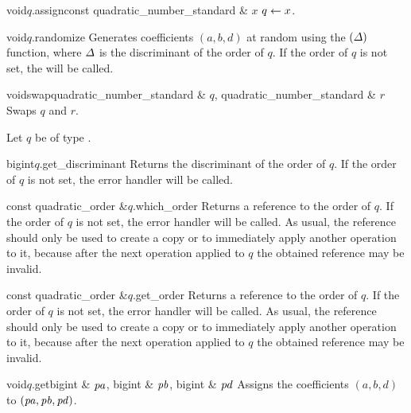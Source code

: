\begin{fcode}{void}{$q$.assign}{const quadratic_number_standard & $x$}
  $q \leftarrow x$.
\end{fcode}

\begin{fcode}{void}{$q$.randomize}{}
  Generates coefficients $(a,b,d)$ at random using the  $(\varDelta)$
  function, where $\varDelta$ is the discriminant of the order of $q$.  If the order of $q$ is not set,
  the \LEH will be called.
\end{fcode}

\begin{fcode}{void}{swap}{quadratic_number_standard & $q$, quadratic_number_standard & $r$}
  Swaps $q$ and $r$.
\end{fcode}



\ACCS

Let $q$ be of type .

\begin{cfcode}{bigint}{$q$.get_discriminant}{}
  Returns the discriminant of the order of $q$.  If the order of $q$ is not set, the error
  handler will be called.
\end{cfcode}

\begin{cfcode}{const quadratic_order &}{$q$.which_order}{}
  Returns a  reference to the order of $q$.  If the order of $q$ is not set, the
  error handler will be called.  As usual, the  reference should only be used to
  create a copy or to immediately apply another operation to it, because after the next
  operation applied to $q$ the obtained reference may be invalid.
\end{cfcode}

\begin{cfcode}{const quadratic_order &}{$q$.get_order}{}
  Returns a  reference to the order of $q$.  If the order of $q$ is not set, the
  error handler will be called.  As usual, the  reference should only be used to
  create a copy or to immediately apply another operation to it, because after the next
  operation applied to $q$ the obtained reference may be invalid.
\end{cfcode}

\begin{cfcode}{void}{$q$.get}{bigint & $\mathit{pa}$, bigint & $\mathit{pb}$, bigint & $\mathit{pd}$}
  Assigns the coefficients $(a,b,d)$ to $(\mathit{pa},\mathit{pb},\mathit{pd})$.
\end{cfcode}

